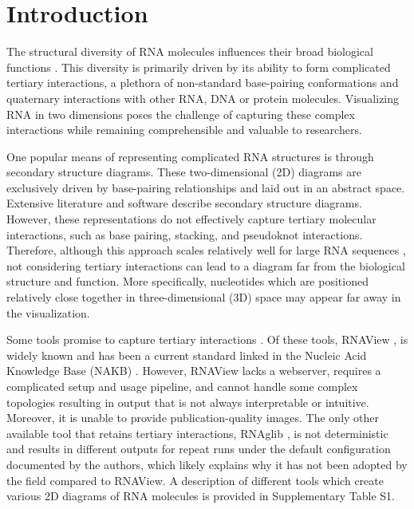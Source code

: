 \section{Introduction} 

The structural diversity of RNA molecules influences their broad biological functions \citep{Tomezsko2020, seemann2017identification, Mortimer2014}. This diversity \citep{Batey1999} is primarily driven by its ability to form complicated tertiary interactions, a plethora of non-standard base-pairing conformations and quaternary interactions with other RNA, DNA or protein molecules. Visualizing RNA in two dimensions poses the challenge of capturing these complex interactions while remaining comprehensible and valuable to researchers.
\par
One popular means of representing complicated RNA structures is through secondary structure diagrams. These two-dimensional (2D) diagrams are exclusively driven by base-pairing relationships and laid out in an abstract space. Extensive literature and software \citep{Johnson2023, Sweeney2021,Weinberg2011,Wiegreffe2019,Shabash2019,Peter2003,Byun2009,Darty2009,Kerpedjiev2015,Lu2018,Waterman1978} describe secondary structure diagrams. However, these representations do not effectively capture tertiary molecular interactions, such as base pairing, stacking, and pseudoknot interactions. Therefore, although this approach scales relatively well for large RNA sequences \citep{Johnson2023}, not considering tertiary interactions can lead to a diagram far from the biological structure and function. More specifically, nucleotides which are positioned relatively close together in three-dimensional (3D) space may appear far away in the visualization.
\par
Some tools promise to capture tertiary interactions \citep{Yang2003,Mallet2022}. Of these tools, RNAView \citep{Yang2003}, is widely known and has been a current standard linked in the Nucleic Acid Knowledge Base (NAKB) \citep{Lawson2024}. However, RNAView \citep{Yang2003} lacks a webserver, requires a complicated setup and usage pipeline, and cannot handle some complex topologies resulting in output that is not always interpretable or intuitive. Moreover, it is unable to provide publication-quality images. The only other available tool that retains tertiary interactions, RNAglib \citep{Mallet2022}, is not deterministic and results in different outputs for repeat runs under the default configuration documented by the authors, which likely explains why it has not been adopted by the field compared to RNAView. A description of different tools which create various 2D diagrams of RNA molecules is provided in Supplementary Table S1.
